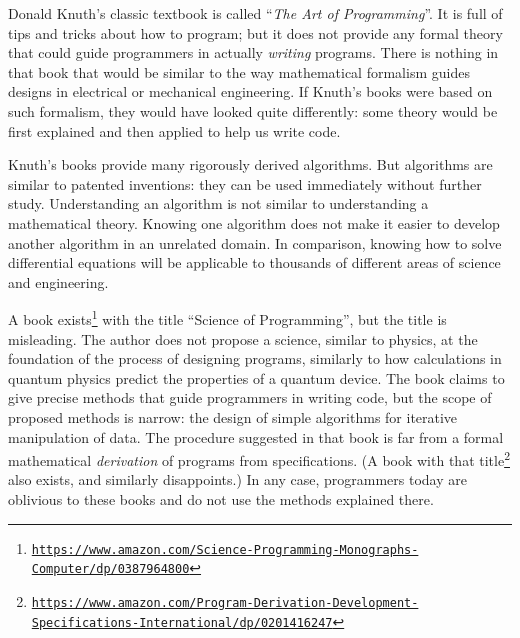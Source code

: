 Donald Knuth\textsf{'}s classic textbook is called \textsf{``}\emph{The Art of Programming}\textsf{''}.
It is full of tips and tricks about how to program; but it does not
provide any formal theory that could guide programmers in actually
\emph{writing} programs. There is nothing in that book that would
be similar to the way mathematical formalism guides designs in electrical
or mechanical engineering. If Knuth\textsf{'}s books were based on such formalism,
they would have looked quite differently: some theory would be first
explained and then applied to help us write code.

Knuth\textsf{'}s books provide many rigorously derived algorithms. But algorithms
are similar to patented inventions: they can be used immediately without
further study. Understanding an algorithm is not similar to understanding
a mathematical theory. Knowing one algorithm does not make it easier
to develop another algorithm in an unrelated domain. In comparison,
knowing how to solve differential equations will be applicable to
thousands of different areas of science and engineering.

A book exists\footnote{\texttt{\href{https://www.amazon.com/Science-Programming-Monographs-Computer/dp/0387964800}{https://www.amazon.com/Science-Programming-Monographs-Computer/dp/0387964800}}}
with the title \textsf{``}Science of Programming\textsf{''}, but the title is misleading.
The author does not propose a science, similar to physics, at the
foundation of the process of designing programs, similarly to how
calculations in quantum physics predict the properties of a quantum
device. The book claims to give precise methods that guide programmers
in writing code, but the scope of proposed methods is narrow: the
design of simple algorithms for iterative manipulation of data. The
procedure suggested in that book is far from a formal mathematical
\emph{derivation} of programs from specifications. (A book with that
title\footnote{\texttt{\href{https://www.amazon.com/Program-Derivation-Development-Specifications-International/dp/0201416247}{https://www.amazon.com/Program-Derivation-Development-Specifications-International/dp/0201416247}}}
also exists, and similarly disappoints.) In any case, programmers
today are oblivious to these books and do not use the methods explained
there.


